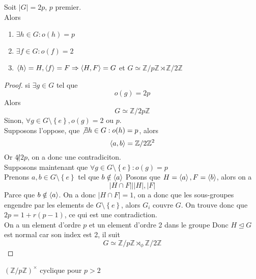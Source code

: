 \documentclass[../main.tex]{subfiles}
\begin{document}
\begin{thm}
Soit $|G|=2p$, $p$ premier.\\
Alors
\begin{enumerate}
	\item $\exists h \in G: o( h) = p$
	\item $\exists f \in G: o( f) = 2$ 
	\item $\left\langle h\right\rangle = H, \left\langle f\right\rangle = F \Rightarrow \left\langle H,F\right\rangle = G$ et $G \simeq \mathbb{Z} / p \mathbb{Z} \rtimes \mathbb{Z}/ 2\mathbb{Z}$
\end{enumerate}

\end{thm}
\begin{proof}
si $\exists g \in G$ tel que 
\[ 
	o( g) = 2p
\]
Alors
\[ 
G \simeq \mathbb{Z} / 2p\mathbb{Z}
\]
Sinon, $\forall g \in G\setminus \left\{ e  \right\} , o( g) = 2$ ou $p$.\\
Supposons l'oppose, que $\not\exists h \in G: o( h) =p$, alors
\[ 
	\left\langle a,b\right\rangle = \mathbb{Z}/ 2\mathbb{Z}^{2}
\]
Or $4 \not| 2p$, on a donc une contradiciton.\\
Supposons maintenant que $\forall g \in G \setminus \left\{ e   \right\}: o( g) =p $\\
Prenons $a,b \in G \setminus \left\{ e  \right\} $ tel que $b \notin \left\langle a\right\rangle$
Posons que $H = \left\langle a\right\rangle, F = \left\langle b\right\rangle$, alors on a
\[ 
|H \cap F| \big| |H|, |F|
\]
Parce que $b \notin \left\langle a\right\rangle$. On a donc $|H \cap F| = 1$, on a donc que les sous-groupes engendre par les elements de $G \setminus \left\{ e   \right\} $, alors $G_i$ couvre $G$. On trouve donc que $2p = 1 + r( p-1) $, ce qui est une contradiction.\\
On a un element d'ordre $p$ et un element d'ordre 2 dans le groupe Donc
$H \trianglelefteq G$ est normal car son index est 2, il suit
\[ 
 G \simeq \mathbb{Z} / p \mathbb{Z} \rtimes_\phi \mathbb{Z}/2\mathbb{Z}
\]
\end{proof}
\begin{crly}
	$ ( \mathbb{Z}/ p\mathbb{Z}) ^{\times}$ cyclique pour $p >2$
\end{crly}
\end{document}
